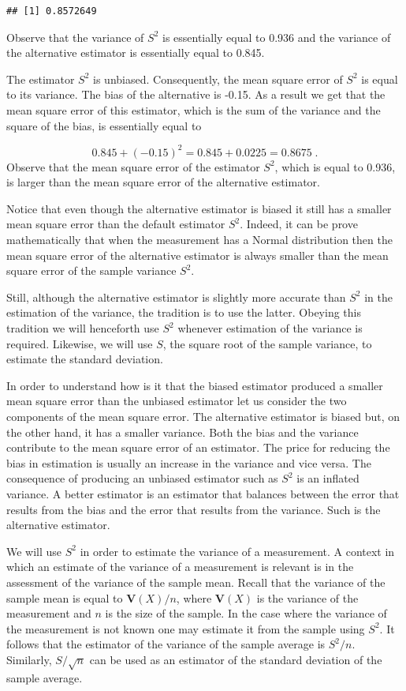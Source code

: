 \documentclass[
]{krantz}
\newcommand{\Var}{\mathbf{V}}
\theoremstyle{definition}
\theoremstyle{definition}
\theoremstyle{definition}
\theoremstyle{remark}
\begin{document}
\begin{verbatim}
## [1] 0.8572649
\end{verbatim}

Observe that the variance of \(S^2\) is essentially equal to 0.936 and the
variance of the alternative estimator is essentially equal to 0.845.

The estimator \(S^2\) is unbiased. Consequently, the mean square error of
\(S^2\) is equal to its variance. The bias of the alternative is -0.15. As
a result we get that the mean square error of this estimator, which is
the sum of the variance and the square of the bias, is essentially equal
to

\[0.845 + (-0.15)^2 = 0.845 + 0.0225 = 0.8675\;.\] Observe that the
mean square error of the estimator \(S^2\), which is equal to 0.936, is
larger than the mean square error of the alternative estimator.

Notice that even though the alternative estimator is biased it still has
a smaller mean square error than the default estimator \(S^2\). Indeed, it
can be prove mathematically that when the measurement has a Normal
distribution then the mean square error of the alternative estimator is
always smaller than the mean square error of the sample variance \(S^2\).

Still, although the alternative estimator is slightly more accurate than
\(S^2\) in the estimation of the variance, the tradition is to use the
latter. Obeying this tradition we will henceforth use \(S^2\) whenever
estimation of the variance is required. Likewise, we will use \(S\), the
square root of the sample variance, to estimate the standard deviation.

In order to understand how is it that the biased estimator produced a
smaller mean square error than the unbiased estimator let us consider
the two components of the mean square error. The alternative estimator
is biased but, on the other hand, it has a smaller variance. Both the
bias and the variance contribute to the mean square error of an
estimator. The price for reducing the bias in estimation is usually an
increase in the variance and vice versa. The consequence of producing an
unbiased estimator such as \(S^2\) is an inflated variance. A better
estimator is an estimator that balances between the error that results
from the bias and the error that results from the variance. Such is the
alternative estimator.

We will use \(S^2\) in order to estimate the variance of a measurement. A
context in which an estimate of the variance of a measurement is
relevant is in the assessment of the variance of the sample mean. Recall
that the variance of the sample mean is equal to \(\Var(X)/n\), where
\(\Var(X)\) is the variance of the measurement and \(n\) is the size of the
sample. In the case where the variance of the measurement is not known
one may estimate it from the sample using \(S^2\). It follows that the
estimator of the variance of the sample average is \(S^2/n\). Similarly,
\(S/\sqrt{n}\) can be used as an estimator of the standard deviation of
the sample average.
\end{document}
